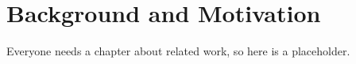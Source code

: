 
\chapter{Background and Motivation\label{ch:background}}

Everyone needs a chapter about related work, so here is a placeholder.




